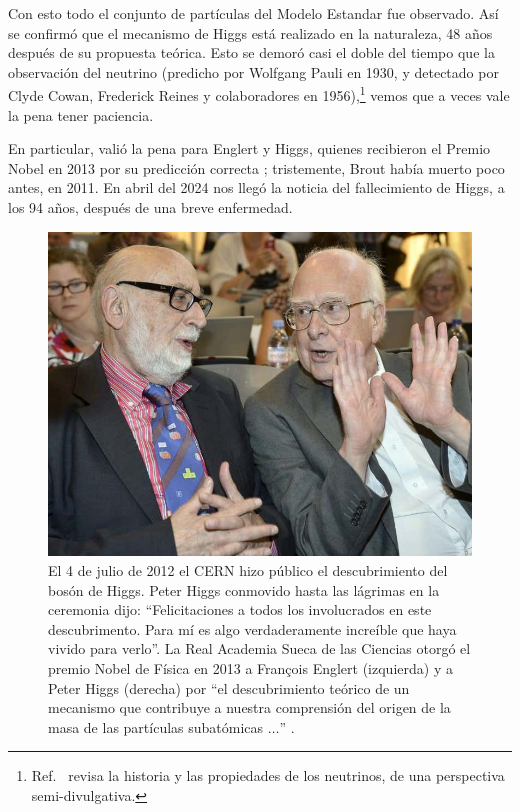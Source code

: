 Con esto todo el conjunto de part\'iculas del Modelo Estandar
fue observado. As\'i se confirm\'o que el mecanismo de Higgs
est\'a realizado en la naturaleza, 48 a\~nos despu\'es de su
propuesta te\'orica. Esto se demor\'o casi el doble del tiempo
que la observaci\'on del neutrino (predicho por Wolfgang Pauli en 1930, y
detectado por Clyde Cowan, Frederick Reines y colaboradores en
1956),\footnote{Ref.\ \cite{neutrinos} revisa la historia y las
propiedades de los neutrinos, de una perspectiva semi-divulgativa.}
vemos que a veces vale la pena tener paciencia.

En particular, vali\'o la pena para Englert y Higgs, quienes recibieron
el Premio Nobel en 2013 por su predicci\'on correcta \cite{Nobel13};
tristemente, Brout hab\'ia muerto poco antes, en 2011.
En abril del 2024 nos lleg\'o la noticia del fallecimiento de Higgs,
a los 94 a\~nos, despu\'es de una breve enfermedad.

\begin{figure}
\centering
\includegraphics[scale=.3]{images/higgs_englert2.jpeg}
\caption{El 4 de julio de 2012 el CERN hizo p\'ublico el
descubrimiento del bos\'on de Higgs. Peter Higgs conmovido hasta
las l\'agrimas en la ceremonia dijo: ``Felicitaciones a todos los
involucrados en este descubrimento. Para m\'i es algo verdaderamente
incre\'ible que haya vivido para verlo''. La Real Academia Sueca de
las Ciencias otorg\'o el premio Nobel de F\'isica en 2013 a Fran\c{c}ois
Englert (izquierda) y a Peter Higgs (derecha) por ``el descubrimiento
te\'orico de un mecanismo que contribuye a nuestra comprensi\'on del
origen de la masa de las part\'iculas subat\'omicas $\dots$''
\cite{YouTube}.}
\end{figure}